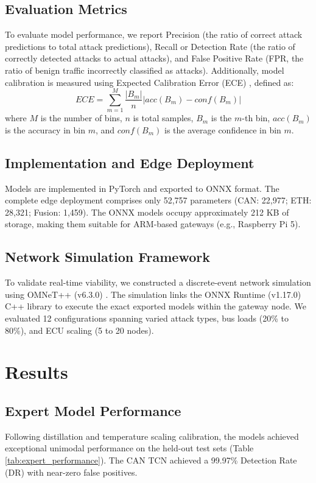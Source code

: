 \documentclass[conference]{IEEEtran}
\begin{document}
\subsection{Evaluation Metrics}
To evaluate model performance, we report Precision (the ratio of correct attack predictions to total attack predictions), Recall or Detection Rate (the ratio of correctly detected attacks to actual attacks), and False Positive Rate (FPR, the ratio of benign traffic incorrectly classified as attacks). Additionally, model calibration is measured using Expected Calibration Error (ECE) \cite{ece_paper}, defined as:
\begin{equation}
ECE = \sum_{m=1}^{M} \frac{|B_m|}{n} |acc(B_m) - conf(B_m)|
\end{equation}
where $M$ is the number of bins, $n$ is total samples, $B_m$ is the $m$-th bin, $acc(B_m)$ is the accuracy in bin $m$, and $conf(B_m)$ is the average confidence in bin $m$.

\subsection{Implementation and Edge Deployment}
Models are implemented in PyTorch and exported to ONNX format. The complete edge deployment comprises only 52,757 parameters (CAN: 22,977; ETH: 28,321; Fusion: 1,459). The ONNX models occupy approximately 212 KB of storage, making them suitable for ARM-based gateways (e.g., Raspberry Pi 5).

\subsection{Network Simulation Framework}
To validate real-time viability, we constructed a discrete-event network simulation using OMNeT++ (v6.3.0) \cite{omnetpp}. The simulation links the ONNX Runtime (v1.17.0) \cite{onnx} C++ library to execute the exact exported models within the gateway node. We evaluated 12 configurations spanning varied attack types, bus loads (20\% to 80\%), and ECU scaling (5 to 20 nodes).

\section{Results}

\subsection{Expert Model Performance}
Following distillation and temperature scaling calibration, the models achieved exceptional unimodal performance on the held-out test sets (Table \ref{tab:expert_performance}). The CAN TCN achieved a 99.97\% Detection Rate (DR) with near-zero false positives. 
\end{document}
